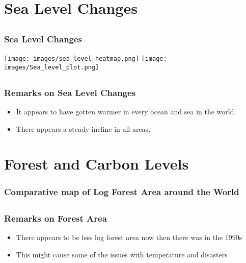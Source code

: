 \documentclass[handout, xcolor=dvipsnames]{beamer}
\begin{document}
\section{Sea Level Changes}  


\subsection{}
\begin{frame}
	\frametitle{Sea Level Changes} %
	\begin{center} 
		\texttt{[image: images/sea\_level\_heatmap.png]} \hspace{1pt}
		\texttt{[image: images/Sea\_level\_plot.png]}
	\end{center}
\end{frame}

\subsection{}
\begin{frame}
	\frametitle{Remarks on Sea Level Changes}
	\begin{itemize}
	\item It appears to have gotten warmer in every ocean and sea in the world. \\[1cm]
        \item There appears a steady incline in all areas. 
    \end{itemize}
\end{frame}

\section{Forest and Carbon Levels}  

\begin{frame}
	\frametitle{Comparative map of Log Forest Area around the World} %
	\begin{center} 
		 \hspace{1pt}
	\end{center}
\end{frame}

\subsection{}
\begin{frame}
	\frametitle{Remarks on Forest Area}
	\begin{itemize}
	\item There appears to be less log forest area now then there was in the 1990s\\[1cm]
        \item This might cause some of the issues with temperature and disasters
    \end{itemize}
\end{frame}
\end{document}
